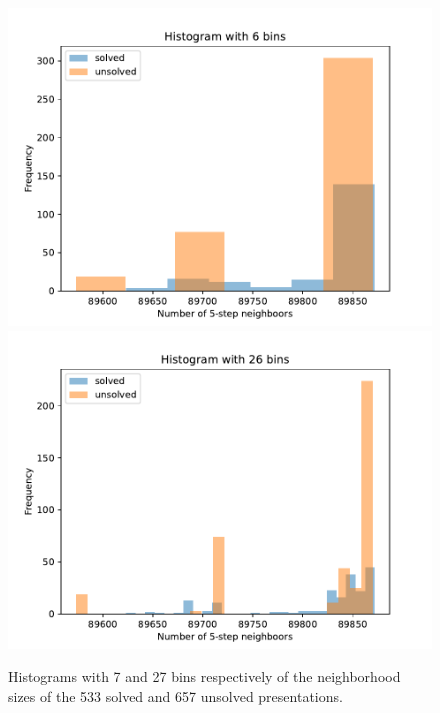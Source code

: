 \begin{figure}
	\centering
    \includegraphics[scale=.34]{fig/prime_histogram_rl.pdf}
	\includegraphics[scale=.34]{fig/prime_histogram_rl2.pdf}
	\caption{Histograms with 7 and 27 bins respectively of the neighborhood sizes of the 533 solved and 657 unsolved presentations.}
	\label{fig:prime_histogram}
\end{figure}